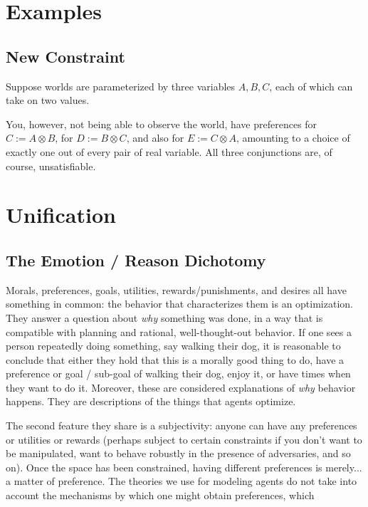 \documentclass{book}
\begin{document}
	\chapter{Examples}
	
	\section{New Constraint}
	Suppose worlds are parameterized by three variables $A, B, C$, each of which can take on two values.
	
	You, however, not being able to observe the world, have preferences for $C := A \otimes B$, for $D := B \otimes C$, and also for $E := C \otimes A$, amounting to a choice of exactly one out of every pair of real variable. All three conjunctions are, of course, unsatisfiable.
	

	\chapter{Unification}
	
	
	
	\section{The Emotion / Reason Dichotomy}
	Morals, preferences, goals, utilities, rewards/punishments, and desires all have something in common: the behavior that characterizes them is an optimization. They answer a question about \emph{why} something was done, in a way that is compatible with planning and rational, well-thought-out behavior. If one sees a person repeatedly doing something, say walking their dog, it is reasonable to conclude that either they hold that this is a morally good thing to do, have a preference or goal / sub-goal of walking their dog, enjoy it, or have times when they want to do it. Moreover, these are considered explanations of \emph{why} behavior happens. They are descriptions of the things that agents optimize.
	
	The second feature they share is a subjectivity: anyone can have any preferences or utilities or rewards (perhaps subject to certain constraints if you don't want to be manipulated, want to behave robustly in the presence of adversaries, and so on). Once the space has been constrained, having different preferences is merely... a matter of preference. The theories we use for modeling agents do not take into account the mechanisms by which one might obtain preferences, which 
	
\end{document}
